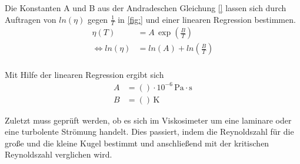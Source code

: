 Die Konstanten A und B aus der Andradeschen Gleichung \ref{} lassen sich durch Auftragen von $ln(\eta)$ gegen $\frac{1}{T}$ in \autoref{fig:} und einer linearen Regression bestimmen.
\begin{align*}
  \eta(T) &= A \, \exp{\left(\frac{B}{T}\right)} \\
  \iff ln(\eta) &= ln(A) + ln(\frac{B}{T}) \\
\end{align*}


Mit Hilfe der linearen Regression ergibt sich
\begin{align*}
  A &= () \cdot 10^{-6} \,\si{\pascal}\cdot\si{\second}\\
  B &= () \,\si{\kelvin}
\end{align*}

Zuletzt muss geprüft werden, ob es sich im Viskosimeter um eine laminare oder eine turbolente Strömung handelt. Dies passiert, indem die Reynoldszahl für die große und die kleine Kugel bestimmt und
anschließend mit der kritischen Reynoldszahl verglichen wird.
